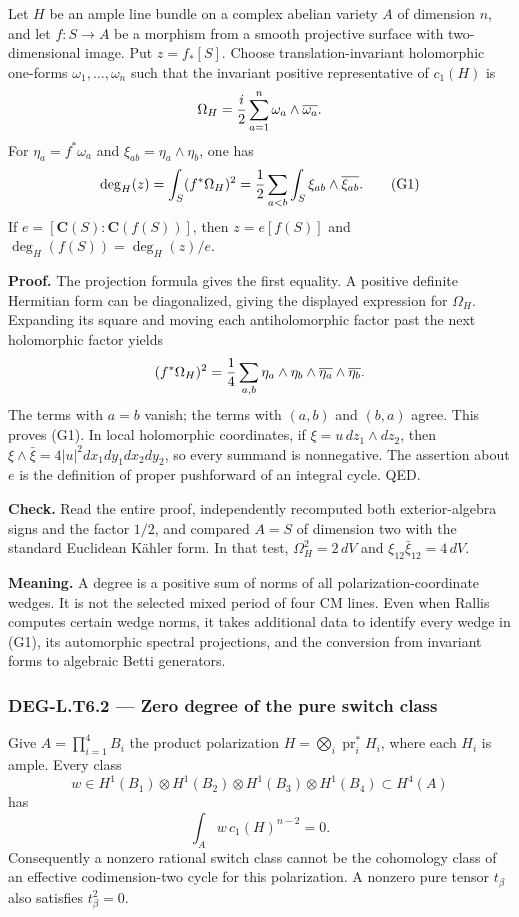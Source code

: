 \documentclass[11pt,a4paper]{article}
\theoremstyle{definition}
\begin{document}
Let \(H\) be an ample line bundle on a complex abelian variety \(A\) of dimension \(n\), and let \(f:S\to A\) be a morphism from a smooth projective surface with two-dimensional image. Put \(z=f_*[S]\). Choose translation-invariant holomorphic one-forms \(\omega_1,\ldots,\omega_n\) such that the invariant positive representative of \(c_1(H)\) is \[
\Omega_H={i\over2}\sum_{a=1}^n\omega_a\wedge\overline{\omega_a}.
\] For \(\eta_a=f^*\omega_a\) and \(\xi_{ab}=\eta_a\wedge\eta_b\), one has \[
\deg_H(z)=\int_S(f^*\Omega_H)^2
={1\over2}\sum_{a<b}\int_S\xi_{ab}\wedge\overline{\xi_{ab}}.
\tag{G1}
\] If \(e=[\mathbf C(S):\mathbf C(f(S))]\), then \(z=e[f(S)]\) and \(\deg_H(f(S))=\deg_H(z)/e\).

\textbf{Proof.} The projection formula gives the first equality. A positive definite Hermitian form can be diagonalized, giving the displayed expression for \(\Omega_H\). Expanding its square and moving each antiholomorphic factor past the next holomorphic factor yields \[
(f^*\Omega_H)^2={1\over4}\sum_{a,b}\eta_a\wedge\eta_b\wedge\overline{\eta_a}\wedge\overline{\eta_b}.
\] The terms with \(a=b\) vanish; the terms with \((a,b)\) and \((b,a)\) agree. This proves (G1). In local holomorphic coordinates, if \(\xi=u\,dz_1\wedge dz_2\), then \(\xi\wedge\bar\xi=4|u|^2dx_1dy_1dx_2dy_2\), so every summand is nonnegative. The assertion about \(e\) is the definition of proper pushforward of an integral cycle. QED.

\textbf{Check.} Read the entire proof, independently recomputed both exterior-algebra signs and the factor \(1/2\), and compared \(A=S\) of dimension two with the standard Euclidean Kähler form. In that test, \(\Omega_H^2=2\,dV\) and \(\xi_{12}\bar\xi_{12}=4\,dV\).

\textbf{Meaning.} A degree is a positive sum of norms of all polarization-coordinate wedges. It is not the selected mixed period of four CM lines. Even when Rallis computes certain wedge norms, it takes additional data to identify every wedge in (G1), its automorphic spectral projections, and the conversion from invariant forms to algebraic Betti generators.

\subsubsection{DEG-L.T6.2 --- Zero degree of the pure switch class}\label{DEG-L.T6.2}

Give \(A=\prod_{i=1}^4B_i\) the product polarization \(H=\bigotimes_i\operatorname{pr}_i^*H_i\), where each \(H_i\) is ample. Every class \[
w\in H^1(B_1)\otimes H^1(B_2)\otimes H^1(B_3)\otimes H^1(B_4)\subset H^4(A)
\] has \[
\int_A w\,c_1(H)^{n-2}=0.
\tag{G2}
\] Consequently a nonzero rational switch class cannot be the cohomology class of an effective codimension-two cycle for this polarization. A nonzero pure tensor \(t_\beta\) also satisfies \(t_\beta^2=0\).
\end{document}
